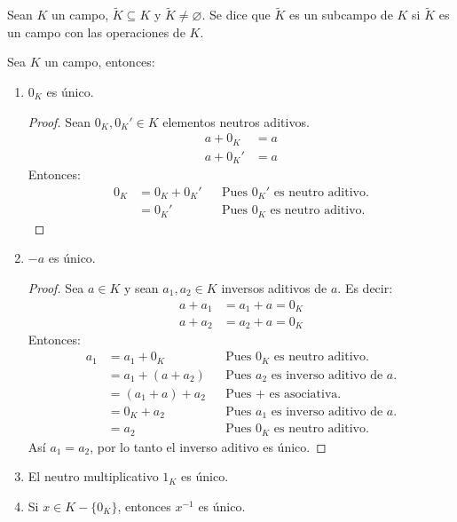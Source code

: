 \begin{definition}{}{}\label{Subcampo}
Sean $K$ un campo, $\tilde{K} \subseteq K$ y $\tilde{K} \neq \varnothing$. Se dice que $\tilde{K}$ es un subcampo de $K$ si $\tilde{K}$ es un campo con las operaciones de $K$.
\end{definition}

\begin{proposition}{}{}
    Sea $K$ un campo, entonces:
    \begin{enumerate} \label{proposicion1_campos}
    \item $0_K$ es único. 
\begin{proof}
    Sean $0_K, 0_K' \in K$ elementos neutros aditivos.
    \begin{align*}
        a + 0_K &= a \\
        a + 0_K' &= a 
    \end{align*}
    Entonces:
    \begin{align*}
        0_K &= 0_K + 0_K' && \text{Pues $0_K'$ es neutro aditivo.} \\
        &= 0_K' && \text{Pues $0_K$ es neutro aditivo.} 
    \end{align*}
\end{proof}

    \item $-a$ es único.

\begin{proof}
    Sea $a\in K$ y sean $a_1, a_2 \in K$ inversos aditivos de $a$. Es decir:
    \begin{align*}
        a + a_1 &= a_1 + a = 0_K \\
        a + a_2 &= a_2 + a = 0_K
    \end{align*}
    Entonces:
    \begin{align*}
        a_1 &= a_1 + 0_K && \text{Pues $0_K$ es neutro aditivo.} \\
        &= a_1 + (a + a_2) && \text{Pues $a_2$ es inverso aditivo de $a$.} \\
        &= (a_1 + a) + a_2 && \text{Pues $+$ es asociativa.} \\
        &= 0_K + a_2 && \text{Pues $a_1$ es inverso aditivo de $a$.} \\
        &= a_2 && \text{Pues $0_K$ es neutro aditivo.}
    \end{align*}
    Así $a_1 = a_2$, por lo tanto el inverso aditivo es único.
\end{proof}

    \item El neutro multiplicativo $1_K$ es único.
    \item Si $x \in K-\{0_K\}$, entonces $x^{-1}$ es único.
    \end{enumerate}
\end{proposition}

